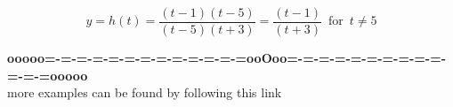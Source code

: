 \documentclass{ximera}
\begin{document}
\[ y = h(t) = \frac{(t-1)(t-5)}{(t-5)(t+3)} = \frac{(t-1)}{(t+3)}  \, \text{ for } \,  t \ne 5  \]
















\begin{center}
\textbf{\textcolor{green!50!black}{ooooo=-=-=-=-=-=-=-=-=-=-=-=-=ooOoo=-=-=-=-=-=-=-=-=-=-=-=-=ooooo}} \\

more examples can be found by following this link\\ 

\end{center}
\end{document}

